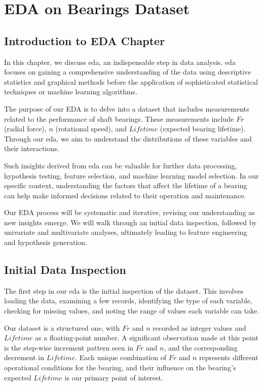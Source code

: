 \chapter{EDA on Bearings Dataset}
\label{sec:bearings-eda}


\section{Introduction to EDA Chapter}

In this chapter, we discuss \ac{eda}, an indispensable step in data analysis. \ac{eda} focuses on gaining a comprehensive understanding of the data using descriptive statistics and graphical methods before the application of sophisticated statistical techniques or machine learning algorithms.

The purpose of our EDA is to delve into a dataset that includes measurements related to the performance of shaft bearings. These measurements include $Fr$ (radial force), $n$ (rotational speed), and $Lifetime$ (expected bearing lifetime). Through our \ac{eda}, we aim to understand the distributions of these variables and their interactions.

Such insights derived from \ac{eda} can be valuable for further data processing, hypothesis testing, feature selection, and machine learning model selection. In our specific context, understanding the factors that affect the lifetime of a bearing can help make informed decisions related to their operation and maintenance.

Our EDA process will be systematic and iterative, revising our understanding as new insights emerge. We will walk through an initial data inspection, followed by univariate and multivariate analyses, ultimately leading to feature engineering and hypothesis generation.


\section{Initial Data Inspection}

The first step in our \ac{eda} is the initial inspection of the dataset. This involves loading the data, examining a few records, identifying the type of each variable, checking for missing values, and noting the range of values each variable can take.

Our dataset is a structured one, with $Fr$ and $n$ recorded as integer values and $Lifetime$ as a floating-point number. A significant observation made at this point is the step-wise increment pattern seen in $Fr$ and $n$, and the corresponding decrement in $Lifetime$. Each unique combination of $Fr$ and $n$ represents different operational conditions for the bearing, and their influence on the bearing's expected $Lifetime$ is our primary point of interest.

